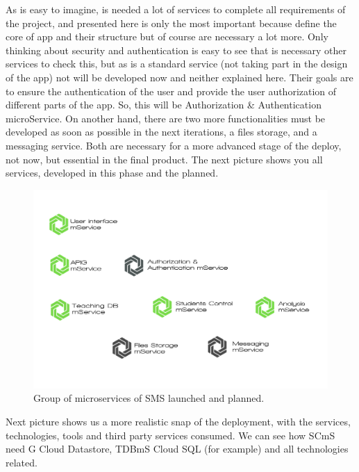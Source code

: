 As is easy to imagine, is needed a lot of services to complete all requirements
of the project, and presented here is only the most important because define the
core of app and their structure but of course are necessary a lot more.
Only thinking about security and authentication is easy to see that is necessary
other services to check this, but as is a standard service (not taking part in
the design of the app) not will be developed now and neither explained here.
Their goals are to ensure the authentication of the user and provide the user
authorization of different parts of the app. So, this will be Authorization \&
Authentication microService.
\intro
On another hand, there are two more functionalities must be developed as soon as
possible in the next iterations, a files storage, and a messaging service.
Both are necessary for a more advanced stage of the deploy, not now, but essential
in the final product. The next picture shows you all services, developed in this
phase and the planned.

\begin{figure}[H]
  \includegraphics[scale=0.22]{img/graphics/final_microservices_distribution.png}
  \centering
  \caption{Group of microservices of SMS launched and planned.}
\end{figure}

\noindent Next picture shows us a more realistic snap of the deployment, with
the services, technologies, tools and third party services consumed.
We can see how SCmS need G Cloud Datastore, TDBmS Cloud SQL (for example) and
all technologies related.

